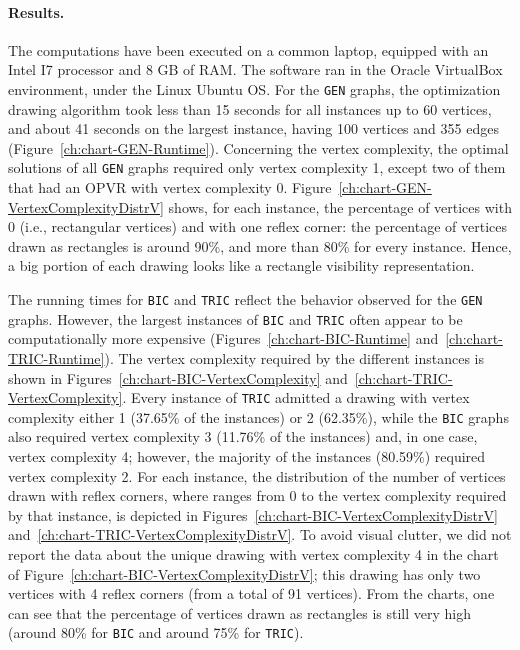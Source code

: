 \documentclass{article}
\newcommand{\opvr}{OPVR\xspace}
\begin{document}
 
\paragraph{Results.}
The computations have been executed on a common laptop, equipped with an Intel I7 processor and 8 GB of RAM. The software ran in the Oracle VirtualBox environment, under the Linux Ubuntu OS. For the {\tt GEN} graphs, the optimization drawing algorithm took less than 15 seconds for all instances up to 60 vertices, and about 41 seconds on the largest instance, having 100 vertices and 355 edges (Figure~\ref{ch:chart-GEN-Runtime}). Concerning the vertex complexity, the optimal solutions of all {\tt GEN} graphs required only vertex complexity 1, except two of them that had an \opvr with vertex complexity 0. Figure~\ref{ch:chart-GEN-VertexComplexityDistrV} shows, for each instance, the percentage of vertices with 0 (i.e., rectangular vertices) and with one reflex corner: the percentage of vertices drawn as rectangles is around 90\%, and more than 80\% for every instance. Hence, a big portion of each drawing looks like a rectangle visibility representation. 


The running times for {\tt BIC} and {\tt TRIC} reflect the behavior observed for the {\tt GEN} graphs. However, the largest instances of {\tt BIC} and {\tt TRIC} often appear to be computationally more expensive (Figures~\ref{ch:chart-BIC-Runtime} and~\ref{ch:chart-TRIC-Runtime}). The vertex complexity required by the different instances is shown in Figures~\ref{ch:chart-BIC-VertexComplexity} and~\ref{ch:chart-TRIC-VertexComplexity}. Every instance of {\tt TRIC} admitted a drawing with vertex complexity either 1 (37.65\% of the instances) or 2 (62.35\%), while the {\tt BIC} graphs also required vertex complexity 3 (11.76\% of the instances) and, in one case, vertex complexity 4; however, the majority of the instances (80.59\%) required vertex complexity 2.
For each instance, the distribution of the number of vertices drawn with  reflex corners, where  ranges from 0 to the vertex complexity required by that instance, is depicted in Figures~\ref{ch:chart-BIC-VertexComplexityDistrV} and~\ref{ch:chart-TRIC-VertexComplexityDistrV}. To avoid visual clutter,  we did not report the data about the unique drawing with vertex complexity 4 in the chart of Figure~\ref{ch:chart-BIC-VertexComplexityDistrV}; this drawing has only two vertices with 4 reflex corners (from a total of 91 vertices). From the charts, one can see that the percentage of vertices drawn as rectangles is still very high (around 80\% for {\tt BIC} and around 75\% for {\tt TRIC}). 
\end{document}
